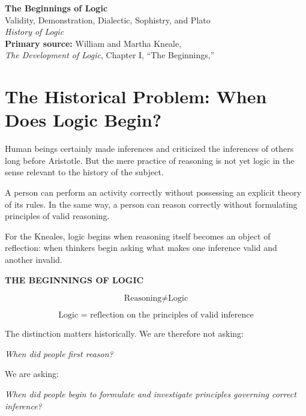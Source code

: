 \documentclass[11pt]{article}
\begin{document}
\begin{center}
    {\LARGE \textbf{The Beginnings of Logic}}\\[0.4em]
    {\large Validity, Demonstration, Dialectic, Sophistry, and Plato}\\[0.8em]
    \textit{History of Logic}\\[0.5em]
    \textbf{Primary source:} William and Martha Kneale,\\
    \textit{The Development of Logic}, Chapter I,
    ``The Beginnings,''
\end{center}

\vspace{1em}

\section{The Historical Problem: When Does Logic Begin?}

Human beings certainly made inferences and criticized the
inferences of others long before Aristotle. But the mere practice
of reasoning is not yet logic in the sense relevant to the history
of the subject.

A person can perform an activity correctly without possessing an
explicit theory of its rules. In the same way, a person can reason
correctly without formulating principles of valid reasoning.

For the Kneales, logic begins when reasoning itself becomes an
object of reflection: when thinkers begin asking what makes one
inference valid and another invalid.

\begin{whiteboard}
\textbf{THE BEGINNINGS OF LOGIC}

\[
\text{Reasoning} \neq \text{Logic}
\]

\[
\boxed{
\text{Logic = reflection on the principles of valid inference}
}
\]
\end{whiteboard}

The distinction matters historically. We are therefore not asking:

\begin{center}
\emph{When did people first reason?}
\end{center}

We are asking:

\begin{center}
\emph{When did people begin to formulate and investigate
principles governing correct inference?}
\end{center}
\end{document}
